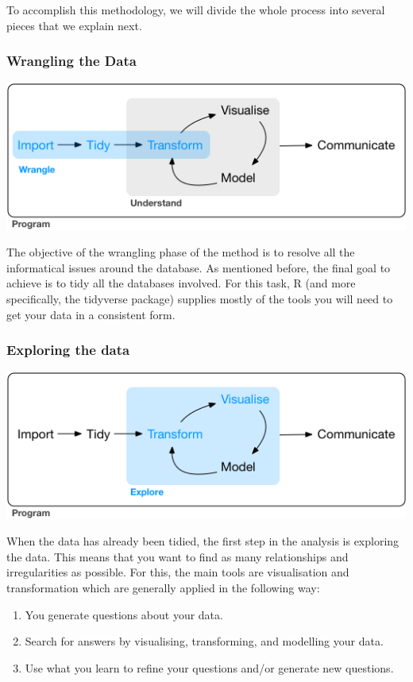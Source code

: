 \documentclass[]{book}
\providecommand{\tightlist}{%
  \setlength{\itemsep}{0pt}\setlength{\parskip}{0pt}}
\begin{document}
To accomplish this methodology, we will divide the whole process into
several pieces that we explain next.

\subsubsection{Wrangling the Data}\label{wrangling-the-data}

\includegraphics{diagrams/data-science-wrangle.png}

The objective of the wrangling phase of the method is to resolve all the
informatical issues around the database. As mentioned before, the final
goal to achieve is to tidy all the databases involved. For this task, R
(and more specifically, the tidyverse package) supplies mostly of the
tools you will need to get your data in a consistent form.

\subsubsection{Exploring the data}\label{exploring-the-data}

\includegraphics{diagrams/data-science-explore.png}

When the data has already been tidied, the first step in the analysis is
exploring the data. This means that you want to find as many
relationships and irregularities as possible. For this, the main tools
are visualisation and transformation which are generally applied in the
following way:

\begin{enumerate}
\def\labelenumi{\arabic{enumi}.}
\tightlist
\item
  You generate questions about your data.
\item
  Search for answers by visualising, transforming, and modelling your
  data.
\item
  Use what you learn to refine your questions and/or generate new
  questions.
\end{enumerate}
\end{document}
